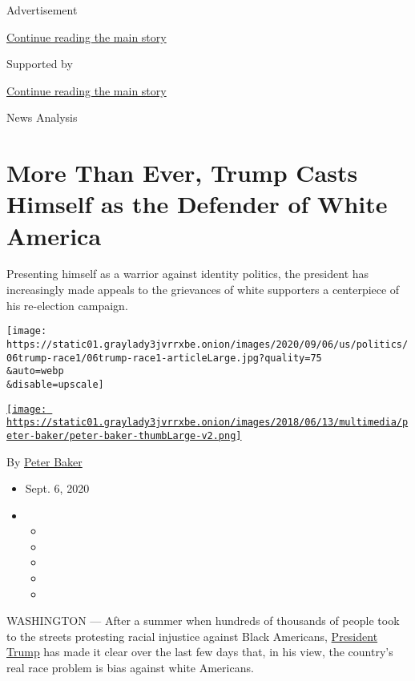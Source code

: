 Advertisement

\protect\hyperlink{after-top}{Continue reading the main story}

Supported by

\protect\hyperlink{after-sponsor}{Continue reading the main story}

News Analysis

\hypertarget{more-than-ever-trump-casts-himself-as-the-defender-of-white-america}{%
\section{More Than Ever, Trump Casts Himself as the Defender of White
America}\label{more-than-ever-trump-casts-himself-as-the-defender-of-white-america}}

Presenting himself as a warrior against identity politics, the president
has increasingly made appeals to the grievances of white supporters a
centerpiece of his re-election campaign.

\texttt{[image: https://static01.graylady3jvrrxbe.onion/images/2020/09/06/us/politics/06trump-race1/06trump-race1-articleLarge.jpg?quality=75\\\&auto=webp\\\&disable=upscale]}

\href{https://www.nytimes3xbfgragh.onion/by/peter-baker}{\texttt{[image: https://static01.graylady3jvrrxbe.onion/images/2018/06/13/multimedia/peter-baker/peter-baker-thumbLarge-v2.png]}}

By \href{https://www.nytimes3xbfgragh.onion/by/peter-baker}{Peter Baker}

\begin{itemize}
\item
  Sept. 6, 2020
\item
  \begin{itemize}
  \item
  \item
  \item
  \item
  \item
  \end{itemize}
\end{itemize}

WASHINGTON --- After a summer when hundreds of thousands of people took
to the streets protesting racial injustice against Black Americans,
\href{https://www.nytimes3xbfgragh.onion/interactive/2020/us/elections/donald-trump.html}{President
Trump} has made it clear over the last few days that, in his view, the
country's real race problem is bias against white Americans.


